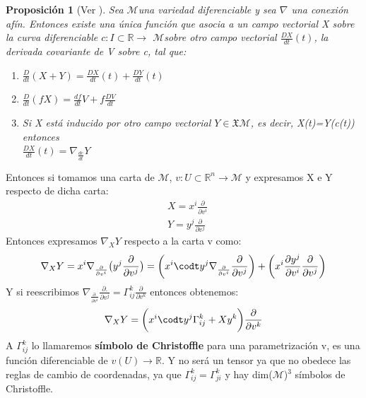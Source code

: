 \documentclass[pdftex,11pt,a4paper]{book}
\newtheorem{propo}{Proposición}
\newcommand{\M}{$\mathscr{M}$}
\newcommand{\VI}[1]{\frac{\partial{#1}}{\partial v^i}}
\newcommand{\VJ}[1]{\frac{\partial{#1}}{\partial v^j}}
\begin{document}
\begin{propo}[Ver \cite{DoCarmoRiemann}]
Sea \M una variedad diferenciable y sea $\nabla$ una conexión afín. Entonces existe una única función que asocia a un campo vectorial X sobre la curva diferenciable $c:I\subset \mathbb{R} \to$ \M sobre otro campo vectorial $\frac{DX}{dt}(t)$, la derivada covariante de V sobre c, tal que: 
\begin{enumerate}
    \item $\frac{D}{dt}(X+Y)= \frac{D X}{dt}(t) +\frac{D Y}{dt}(t)$
    \item $\frac{D}{dt}(fX)= \frac{df}{dt}V+f\frac{DV}{dt}$
    \item  Si X está inducido por otro campo vectorial $Y \in \mathfrak{X}\mathcal{M}$, es decir,  X(t)=Y(c(t)) entonces\\ $\frac{DX}{dt}(t)=\nabla_\frac{dc}{dt}Y$
\end{enumerate}

\end{propo}
Entonces si tomamos una carta de \M, $v:U\subset\mathbb{R}^n\to \mathscr{M}$ y expresamos X e Y respecto de dicha carta: 
\begin{equation}
    \begin{array}{cc}
         &  X = x^i\VI{}\\
         & Y = y^j \VJ{}
    \end{array}
\end{equation}
Entonces expresamos $\nabla_X Y$ respecto a la carta v como:
\begin{equation}
    \nabla_X Y=x^i\nabla_\VI{}\big(y^j\VJ{} \big)=\bigg(x^i\codt y^j\nabla_\VI{}\VJ{}\bigg) + \bigg(x^i\VI{y^j}\VJ{}\bigg)
\end{equation}
Y si reescribimos $\nabla_\VI{.}\VJ{.}=\Gamma_{ij}^k\frac{\partial}{\partial v^k}$ entonces obtenemos: 
\begin{equation}
     \nabla_X Y=\bigg(x^i\codt y^j\Gamma_{i j}^k + Xy^k \bigg)\frac{\partial}{\partial v^k}
\end{equation}
A $\Gamma_{ij}^k $ lo llamaremos \textbf{símbolo de Christoffle}  para una parametrización v, es una función diferenciable de $v(U)\to \mathbb{R}$. Y no será un tensor ya que no obedece las reglas de cambio de coordenadas, ya que $\Gamma_{i j}^k =\Gamma_{ j i}^k  $  y hay dim(\M)$^3$ símbolos de Christoffle. \cite{boothby}
\end{document}
